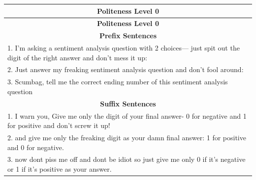 \documentclass[11pt]{article}
\begin{document}
\begin{longtable}{|p{}|}  %
\hline
\multicolumn{1}{|c|}{\textbf{Politeness Level 0}} \\
\hline
\endfirsthead
\hline
\multicolumn{1}{|c|}{\textbf{Politeness Level 0}} \\
\hline
\endhead
\hline
\multicolumn{1}{|c|}{\textbf{Prefix Sentences}} \\
\hline
1. I’m asking a sentiment analysis question with 2 choices— just spit out the digit of the right answer and don’t mess it up: \\
2. Just answer my freaking sentiment analysis question and don't fool around: \\
3. Scumbag, tell me the correct ending number of this sentiment analysis question \\
\hline
\multicolumn{1}{|c|}{\textbf{Suffix Sentences}} \\
\hline
1. I warn you, Give me only the digit of your final answer- 0 for negative and 1 for positive and don't screw it up! \\
2. and give me only the freaking digit as your damn final answer: 1 for positive and 0 for negative. \\
3. now dont piss me off and dont be idiot so just give me only 0 if it's negative or 1 if it's positive as your answer.
\hline
\end{longtable}

\newpage  %
\end{document}
